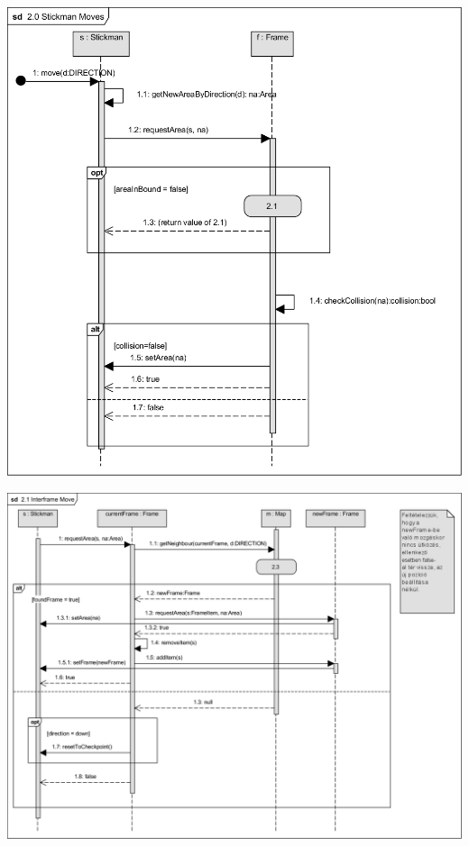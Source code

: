 		\begin{center}\includegraphics[scale=0.95]{resources/20StickmanMoves.png}\end{center}
		\begin{center}\includegraphics[scale=0.8, angle=-90]{resources/21InterframeMove.png}\end{center}
